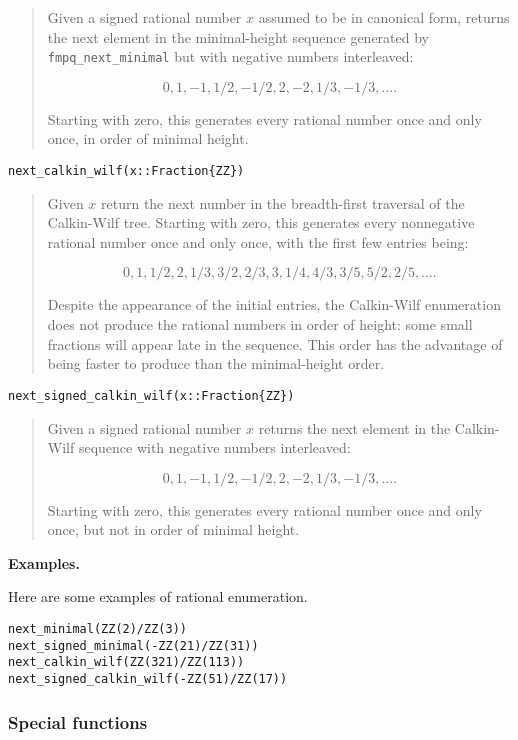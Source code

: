 \documentclass[a4paper,10pt]{article}
\newcommand{\code}{\lstinline}
\newcommand{\desc}[1]{\vspace{-3mm}\begin{quote}#1\end{quote}}
\begin{document}
{{{\desc{Given a signed rational number $x$ assumed to be in canonical form, 
returns the next element in the minimal-height sequence generated by 
\code{fmpq_next_minimal} but with negative numbers interleaved:

$$0, 1, -1, 1/2, -1/2, 2, -2, 1/3, -1/3, \ldots.$$

Starting with zero, this generates every rational number once and only once,
in order of minimal height.}

\begin{lstlisting}
next_calkin_wilf(x::Fraction{ZZ})
\end{lstlisting}

\desc{Given $x$ return the next number in the breadth-first traversal of the
Calkin-Wilf tree. Starting with zero, this generates every nonnegative
rational number once and only once, with the first few entries being:

$$0, 1, 1/2, 2, 1/3, 3/2, 2/3, 3, 1/4, 4/3, 3/5, 5/2, 2/5, \ldots.$$

Despite the appearance of the initial entries, the Calkin-Wilf enumeration 
does not produce the rational numbers in order of height: some small fractions
will appear late in the sequence. This order has the advantage of being faster 
to produce than the minimal-height order.}

\begin{lstlisting}
next_signed_calkin_wilf(x::Fraction{ZZ})
\end{lstlisting}

\desc{Given a signed rational number $x$ returns the next element in the
Calkin-Wilf sequence with negative numbers interleaved:

$$0, 1, -1, 1/2, -1/2, 2, -2, 1/3, -1/3, \ldots.$$

Starting with zero, this generates every rational number once and only once,
but not in order of minimal height.}

\textbf{Examples.}

Here are some examples of rational enumeration.

\begin{lstlisting}
next_minimal(ZZ(2)/ZZ(3))
next_signed_minimal(-ZZ(21)/ZZ(31))
next_calkin_wilf(ZZ(321)/ZZ(113))
next_signed_calkin_wilf(-ZZ(51)/ZZ(17))
\end{lstlisting}

\subsubsection{Special functions}

}}}
\end{document}
